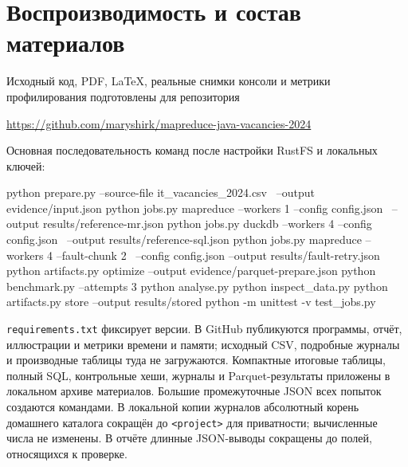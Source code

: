 \documentclass[11pt,a4paper]{article}
\begin{document}
\section{Воспроизводимость и состав материалов}\label{sec:commands}
Исходный код, PDF, LaTeX, реальные снимки консоли и метрики профилирования подготовлены для репозитория
\begin{center}
\url{https://github.com/maryshirk/mapreduce-java-vacancies-2024}
\end{center}
Основная последовательность команд после настройки RustFS и локальных ключей:
\begin{terminal}
python prepare.py --source-file it_vacancies_2024.csv \
  --output evidence/input.json
python jobs.py mapreduce --workers 1 --config config.json \
  --output results/reference-mr.json
python jobs.py duckdb --workers 4 --config config.json \
  --output results/reference-sql.json
python jobs.py mapreduce --workers 4 --fault-chunk 2 \
  --config config.json --output results/fault-retry.json
python artifacts.py optimize --output evidence/parquet-prepare.json
python benchmark.py --attempts 3
python analyse.py
python inspect_data.py
python artifacts.py store --output results/stored
python -m unittest -v test_jobs.py
\end{terminal}
\texttt{requirements.txt} фиксирует версии. В GitHub публикуются программы, отчёт, иллюстрации и метрики времени и памяти; исходный CSV, подробные журналы и производные таблицы туда не загружаются. Компактные итоговые таблицы, полный SQL, контрольные хеши, журналы и Parquet-результаты приложены в локальном архиве материалов. Большие промежуточные JSON всех попыток создаются командами. В локальной копии журналов абсолютный корень домашнего каталога сокращён до \texttt{<project>} для приватности; вычисленные числа не изменены. В отчёте длинные JSON-выводы сокращены до полей, относящихся к проверке.
\end{document}
